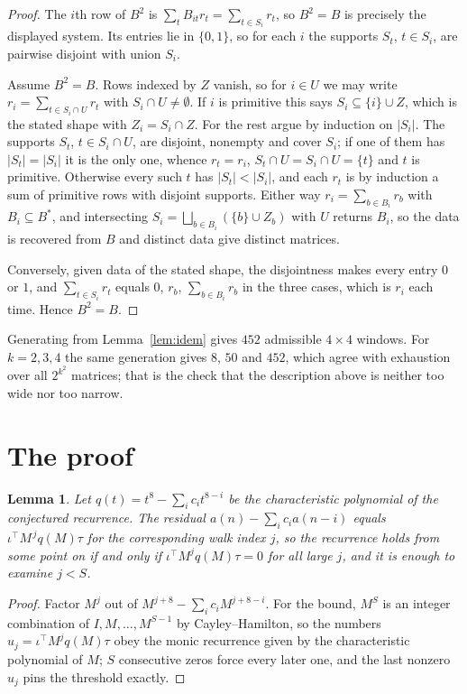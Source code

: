 \documentclass[11pt,a4paper]{article}
\theoremstyle{plain}
\newtheorem{lemma}[theorem]{Lemma}
\theoremstyle{definition}
\begin{document}
\begin{proof}
The $i$th row of $B^2$ is $\sum_t B_{it}r_t=\sum_{t\in S_i}r_t$, so $B^2=B$ is precisely the
displayed system. Its entries lie in $\{0,1\}$, so for each $i$ the supports $S_t$,
$t\in S_i$, are pairwise disjoint with union $S_i$.

Assume $B^2=B$. Rows indexed by $Z$ vanish, so for $i\in U$ we may write
$r_i=\sum_{t\in S_i\cap U}r_t$ with $S_i\cap U\neq\emptyset$. If $i$ is primitive this says
$S_i\subseteq\{i\}\cup Z$, which is the stated shape with $Z_i=S_i\cap Z$. For the rest argue
by induction on $|S_i|$. The supports $S_t$, $t\in S_i\cap U$, are disjoint, nonempty and
cover $S_i$; if one of them has $|S_t|=|S_i|$ it is the only one, whence $r_t=r_i$,
$S_t\cap U=S_i\cap U=\{t\}$ and $t$ is primitive. Otherwise every such $t$ has
$|S_t|<|S_i|$, and each $r_t$ is by induction a sum of primitive rows with disjoint supports.
Either way $r_i=\sum_{b\in B_i}r_b$ with $B_i\subseteq B^{\ast}$, and intersecting
$S_i=\bigsqcup_{b\in B_i}(\{b\}\cup Z_b)$ with $U$ returns $B_i$, so the data is recovered
from $B$ and distinct data give distinct matrices.

Conversely, given data of the stated shape, the disjointness makes every entry $0$ or $1$, and
$\sum_{t\in S_i}r_t$ equals $0$, $r_b$, $\sum_{b\in B_i}r_b$ in the three cases, which is
$r_i$ each time. Hence $B^2=B$.
\end{proof}

Generating from Lemma~\ref{lem:idem} gives $452$ admissible $4\times4$ windows. For
$k=2,3,4$ the same generation gives $8$, $50$ and $452$, which agree with exhaustion over all
$2^{k^2}$ matrices; that is the check that the description above is neither too wide nor too
narrow.

\section{The proof}

\begin{lemma}\label{lem:crit}
Let $q(t)=t^{8}-\sum_i c_it^{8-i}$ be the characteristic polynomial of the
conjectured recurrence. The residual $a(n)-\sum_ic_ia(n-i)$ equals
$\iota^{\!\top}M^{\,j}q(M)\tau$ for the corresponding walk index $j$, so the recurrence
holds from some point on if and only if $\iota^{\!\top}M^{j}q(M)\tau=0$ for all large $j$,
and it is enough to examine $j<S$.
\end{lemma}

\begin{proof}
Factor $M^{j}$ out of $M^{j+8}-\sum_ic_iM^{j+8-i}$. For the bound, $M^{S}$
is an integer combination of $I,M,\dots,M^{S-1}$ by Cayley--Hamilton, so the numbers
$u_j=\iota^{\!\top}M^{j}q(M)\tau$ obey the monic recurrence given by the characteristic
polynomial of $M$; $S$ consecutive zeros force every later one, and the last nonzero $u_j$
pins the threshold exactly.
\end{proof}
\end{document}
